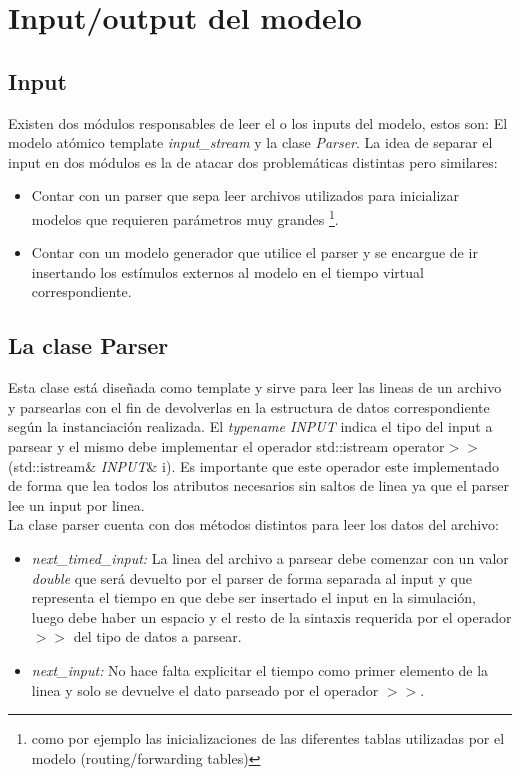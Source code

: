 \documentclass[10pt,a4paper]{article}
\begin{document}
\section{Input/output del modelo}

\subsection{Input}
Existen dos módulos responsables de leer el o los inputs del modelo, estos son: El modelo atómico template \textit{input\_stream} y la clase \textit{Parser}. La idea de separar el input en dos módulos es la de atacar dos problemáticas distintas pero similares:

\begin{itemize}
\item Contar con un parser que sepa leer archivos utilizados para inicializar modelos que requieren parámetros muy grandes \footnote{como por ejemplo las inicializaciones de las diferentes tablas utilizadas por el modelo (routing/forwarding tables)}.
\item Contar con un modelo generador que utilice el parser y se encargue de ir insertando los estímulos externos al modelo en el tiempo virtual correspondiente.\\
\end{itemize}

\subsection{La clase Parser}
Esta clase está diseñada como template y sirve para leer las lineas de un archivo y parsearlas con el fin de devolverlas en la estructura de datos correspondiente según la instanciación realizada. El \textit{typename INPUT} indica el tipo del input a parsear y el mismo debe implementar el operador std::istream \textsf{operator}$>>$(\textsf{std::istream}\& \textit{INPUT}\& i). Es importante que este operador este implementado de forma que lea todos los atributos necesarios sin saltos de linea ya que el parser lee un input por linea.\\

La clase parser cuenta con dos métodos distintos para leer los datos del archivo:
\begin{itemize}
\item \textit{next\_timed\_input:} La linea del archivo a parsear debe comenzar con un valor \textit{double} que será devuelto por el parser de forma separada al input y que representa el tiempo en que debe ser insertado el input en la simulación, luego debe haber un espacio y el resto de la sintaxis requerida por el operador $>>$ del tipo de datos a parsear. 
\item \textit{next\_input:} No hace falta explicitar el tiempo como primer elemento de la linea y solo se devuelve el dato parseado por el operador $>>$.
\end{itemize}
\end{document}
